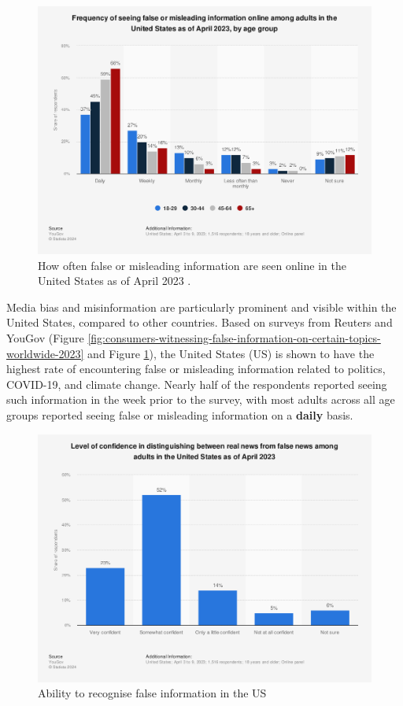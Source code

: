 \begin{figure}[htbp]
    \centering
    \includegraphics[width=0.7\linewidth]{images/statistic_id1462057_frequency-of-seeing-false-information-online-in-the-us-2023-by-age-group.png}
    \caption{How often false or misleading information are seen online in the United States as of April 2023 \cite{yougov-2023-frequency}.}
    \label{fig:frequency-of-seeing-false-information-online-in-the-us-2023-by-age-group}
\end{figure}

Media bias and misinformation are particularly prominent and visible within the United States, compared to other countries. Based on surveys from Reuters \cite{reuters-2023-false-info} and YouGov \cite{yougov-2023-frequency} (Figure \ref{fig:consumers-witnessing-false-information-on-certain-topics-worldwide-2023} and Figure \ref{fig:frequency-of-seeing-false-information-online-in-the-us-2023-by-age-group}), the United States (US) is shown to have the highest rate of encountering false or misleading information related to politics, COVID-19, and climate change. Nearly half of the respondents reported seeing such information in the week prior to the survey, with most adults across all age groups reported seeing false or misleading information on a \textbf{daily} basis.

\begin{figure}[htbp]
    \centering
    \includegraphics[width=0.7\linewidth]{images/statistic_id657090_ability-to-recognize-false-information-and-news-in-the-us-2023.png}
    \caption{Ability to recognise false information in the US \cite{yougov-2023-confidence}}
    \label{fig:ability-to-recognize-false-information-and-news-in-the-us-2023}
\end{figure}

